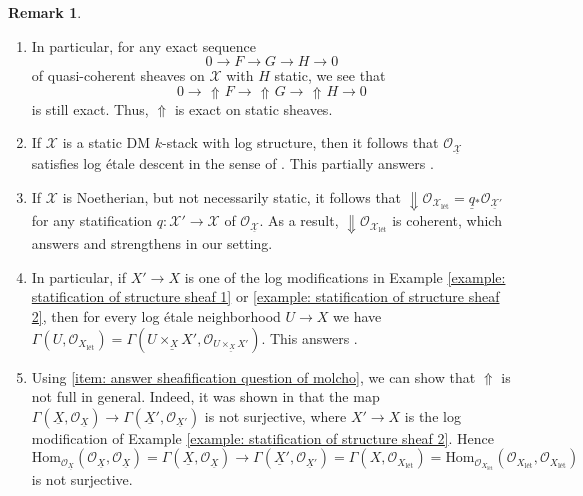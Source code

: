 \documentclass[11pt]{amsart}
\theoremstyle{definition}
\theoremstyle{definition}
\newtheorem{remark}[theorem]{Remark}
\DeclareMathOperator{\arrowup}{\!\Uparrow \!}
\newcommand{\cO}{\mathcal{O}}
\newcommand{\cX}{\mathcal{X}}
\newcommand{\LogO}[1]{\mathcal{O}_{{#1}_\text{l\'et}}}
\newcommand{\ul}[1]{\underline{#1}}
\newcommand{\cal}{\mathcal}
\def\cO{{\cal O}}
\def\cX{{\cal X}}
\begin{document}
\begin{remark}\label{remark: up is exact on statics}
    \begin{enumerate}
        \item In particular, for any exact sequence $$0\longrightarrow F\longrightarrow G\longrightarrow H\longrightarrow 0$$ of quasi-coherent sheaves on $\mathcal{X}$ with $H$ static, we see that $$0\longrightarrow \arrowup F\longrightarrow \arrowup G\longrightarrow\arrowup H\longrightarrow 0$$ is still exact. Thus, $\Uparrow$ is exact on static sheaves.
        \item If $\cX$ is a static DM $k$-stack with log structure, then it follows that $\cO_{\ul{\cX}}$ satisfies log \'etale descent in the sense of \cite{molcho2023remarks}. This partially answers \cite[Question 1.7.2]{molcho2023remarks}.
        \item If $\cX$ is Noetherian, but not necessarily static, it follows that $\Downarrow \!\!\LogO{\cX} = \ul{q}{}_*\cO_{\ul{\cX}'}$ for any statification $q\colon\cX'\rightarrow\cX$ of $\cO_{\ul{\cX}}$. As a result, $\Downarrow\!\!\LogO{\cX}$ is coherent, which answers and strengthens \cite[Question 1.7.1]{molcho2023remarks} in our setting.
        \item\label{item: answer sheafification question of molcho} %
        In particular, if $X'\rightarrow X$ is one of the log modifications in Example \ref{example: statification of structure sheaf 1} or \ref{example: statification of structure sheaf 2}, then for every log \'etale neighborhood $U\rightarrow X$ we have $\Gamma(U,\LogO{X}) = \Gamma(\ul{U\times_X X'},\cO_{\ul{U\times_X X'}})$. This answers \cite[Question 1.7.3]{molcho2023remarks}.
        \item Using \eqref{item: answer sheafification question of molcho}, we can show that $\Uparrow$ is not full in general. Indeed, it was shown in \cite[Example 6.8]{molcho2023remarks} that the map $\Gamma(\ul{X},\cO_{\ul{X}})\rightarrow \Gamma(\ul{X}',\cO_{\ul{X}'})$ is not surjective, where $X'\rightarrow X$ is the log modification of Example \ref{example: statification of structure sheaf 2}. Hence
        \[
            \text{Hom}_{\cO_{\underline{X}}}(\cO_{\ul{X}},\cO_{\ul{X}}) = \Gamma(\ul{X},\cO_{\ul{X}}) \longrightarrow \Gamma(\ul{X}',\cO_{\ul{X}'}) =\Gamma(X,\LogO{X}) = \text{Hom}_{\cO_{X_{\text{l\'et}}}}(\LogO{X},\LogO{X})
        \]
        is not surjective.
    \end{enumerate} 
\end{remark}
\end{document}
